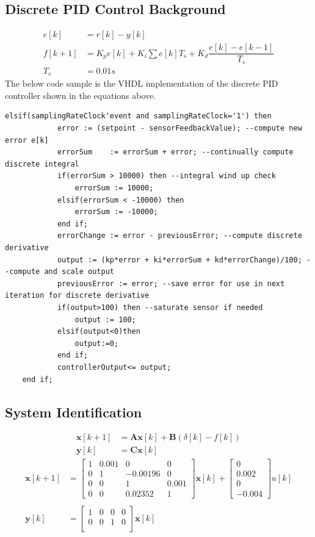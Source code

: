 \documentclass{article}
\begin{document}
\subsection{Discrete PID Control Background}
\begin{align*}
e[k] &= r[k]-y[k]\\
f[k+1] &= K_pe[k]+K_i\sum e[k]T_s + K_d\dfrac{e[k]-e[k-1]}{T_s}\\
T_s&=0.01 s
\end{align*}
The below code sample is the VHDL implementation of the discrete PID controller shown in the equations above.
\begin{lstlisting}
elsif(samplingRateClock'event and samplingRateClock='1') then
			error := (setpoint - sensorFeedbackValue); --compute new error e[k]
			errorSum	:= errorSum + error; --continually compute discrete integral
			if(errorSum > 10000) then --integral wind up check
				errorSum := 10000;
			elsif(errorSum < -10000) then
				errorSum := -10000;
			end if;
			errorChange := error - previousError; --compute discrete derivative
			output := (kp*error + ki*errorSum + kd*errorChange)/100; --compute and scale output
			previousError := error; --save error for use in next iteration for discrete derivative
			if(output>100) then --saturate sensor if needed
				output := 100;
			elsif(output<0)then
				output:=0;
			end if;
			controllerOutput<= output;
	end if;
\end{lstlisting}
\subsection{System Identification}
 \begin{align*}
\boldsymbol{x}[k+1] &= \boldsymbol{A}\boldsymbol{x}[k] + \boldsymbol{B}(\delta[k]-f[k])\\
\boldsymbol{y}[k] &= \boldsymbol{C}\boldsymbol{x}[k]
\end{align*}
\begin{align*}
  \boldsymbol{x}[k+1] &= \begin{bmatrix}
	1 & 0.001 & 0 & 0\\
	0 & 1 & -0.00196 & 0\\
	0 & 0 & 1 &0.001 \\
	0 & 0 & 0.02352 & 1
\end{bmatrix}\boldsymbol{x}[k]+\begin{bmatrix} 0 \\ 0.002 \\ 0 \\ -0.004\end{bmatrix}u[k]\\\\
\boldsymbol{y}[k] &= \begin{bmatrix}
	1 & 0 & 0 & 0\\
	0 & 0 & 1 & 0\\
\end{bmatrix}\boldsymbol{x}[k]
\end{align*}
\end{document}
